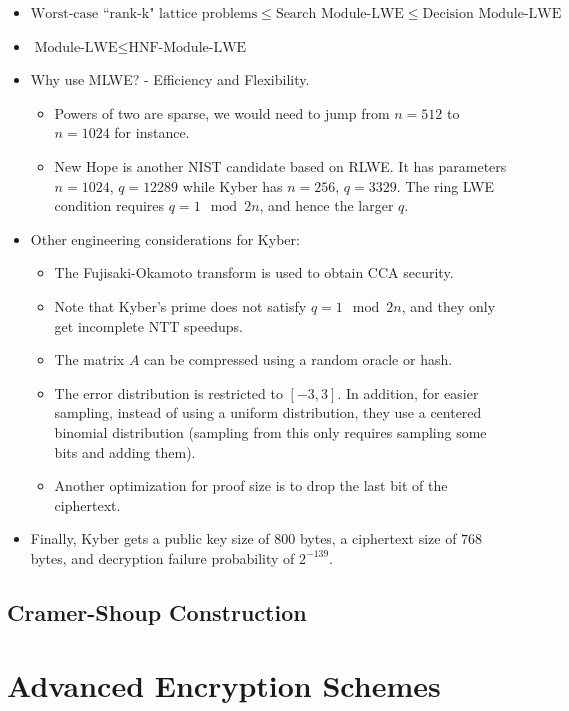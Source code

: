 \documentclass[12pt]{tufte-book}
\begin{document}
\begin{itemize}
    \item $\text{Worst-case ``rank-k" lattice problems} \leq \text{Search Module-LWE} \leq \text{Decision Module-LWE}$
    \item $\text{Module-LWE} \leq \text{HNF-Module-LWE}$ ~\cite{DCC:LanSte15}
    \item Why use MLWE? - Efficiency and Flexibility.
    \begin{itemize}
        \item Powers of two are sparse, we would need to jump from $n=512$ to $n=1024$ for instance.
        \item New Hope is another NIST candidate based on RLWE. It has parameters $n=1024$, $q=12289$ while Kyber has $n=256$, $q=3329$. The ring LWE condition requires $q = 1 \mod 2n$, and hence the larger $q$. 
    \end{itemize}
    \item Other engineering considerations for Kyber:
    \begin{itemize}
        \item The Fujisaki-Okamoto transform is used to obtain CCA security.
        \item Note that Kyber's prime does not satisfy $q = 1 \mod 2n$, and they only get incomplete NTT speedups.
        \item The matrix $A$ can be compressed using a random oracle or hash.
        \item The error distribution is restricted to $[-3,3]$. In addition, for easier sampling, instead of using a uniform distribution, they use a centered binomial distribution (sampling from this only requires sampling some bits and adding them).
        \item Another optimization for proof size is to drop the last bit of the ciphertext.
    \end{itemize}
    \item Finally, Kyber gets a public key size of $800$ bytes, a ciphertext size of $768$ bytes, and decryption failure probability of $2^{-139}$.
\end{itemize}  \section{Cramer-Shoup Construction}
 \chapter{Advanced Encryption Schemes}
\end{document}
